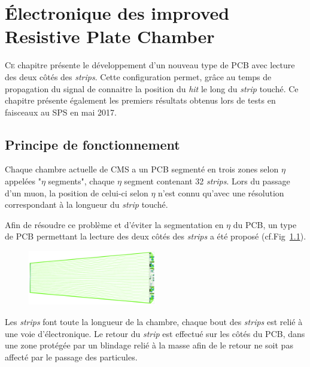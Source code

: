 \chapter{Électronique des improved Resistive Plate Chamber}
\label{time}
\renewcommand\chapterillustration{ELE/ele}
\ThisULCornerWallPaper{1}{\chapterillustration}
\minitoc

\lettrine[lines=4, slope=-0.5em]{C}{e} chapitre présente le développement d'un nouveau type de PCB avec lecture des deux côtés des \textit{strips}. Cette configuration permet, grâce au temps de propagation du signal de connaitre la position du \textit{hit} le long du \textit{strip} touché. Ce chapitre présente également les premiers résultats obtenus lors de tests en faisceaux au SPS en mai 2017.
\vspace{-0.3cm}
\section{Principe de fonctionnement}
\vspace{-0.5cm}
Chaque chambre actuelle de CMS a un PCB segmenté en trois zones selon $\eta$ appelées "$\eta$ segments", chaque $\eta$ segment contenant \num{32} \textit{strips}. Lors du passage d'un muon, la position de celui-ci selon $\eta$ n'est connu qu'avec une résolution correspondant à la longueur du \textit{strip} touché.

Afin de résoudre ce problème et d'éviter la segmentation en $\eta$ du PCB, un type de PCB permettant la lecture des deux côtés des \textit{strips} a été proposé (cf.Fig~\ref{PCB1}).
\vspace*{-0.5cm}
\begin{figure}[ht!]
	\centering
	\includegraphics[width=0.50\textwidth]{ELE/PCB1.png}
	\label{PCB1}
\end{figure}

\vspace{-0.3cm}
Les \textit{strips} font toute la longueur de la chambre, chaque bout des \textit{strips} est relié à une voie d'électronique. Le retour du \textit{strip} est effectué sur les côtés du PCB, dans une zone protégée par un blindage relié à la masse afin de le retour ne soit pas affecté par le passage des particules.

